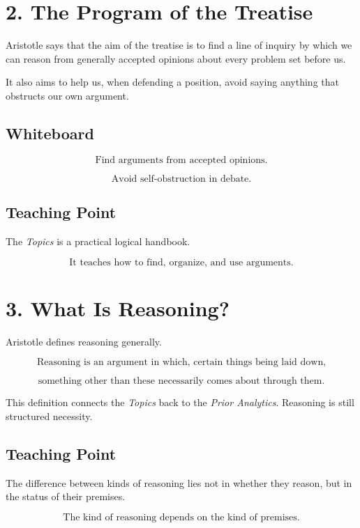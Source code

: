 \documentclass[12pt]{article}
\begin{document}
\section*{2. The Program of the Treatise}

Aristotle says that the aim of the treatise is to find a line of inquiry by
which we can reason from generally accepted opinions about every problem set
before us.

It also aims to help us, when defending a position, avoid saying anything that
obstructs our own argument.

\subsection*{Whiteboard}

\[
\text{Find arguments from accepted opinions.}
\]

\[
\text{Avoid self-obstruction in debate.}
\]

\subsection*{Teaching Point}

The \textit{Topics} is a practical logical handbook.

\[
\boxed{
\text{It teaches how to find, organize, and use arguments.}
}
\]

\section*{3. What Is Reasoning?}

Aristotle defines reasoning generally.

\[
\boxed{
\text{Reasoning is an argument in which, certain things being laid down,}
}
\]

\[
\boxed{
\text{something other than these necessarily comes about through them.}
}
\]

This definition connects the \textit{Topics} back to the
\textit{Prior Analytics}. Reasoning is still structured necessity.

\subsection*{Teaching Point}

The difference between kinds of reasoning lies not in whether they reason, but
in the status of their premises.

\[
\boxed{
\text{The kind of reasoning depends on the kind of premises.}
}
\]
\end{document}
